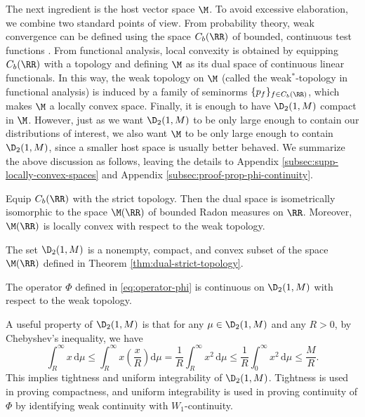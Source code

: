 The next ingredient is the host vector space $\M$. To avoid excessive elaboration, we combine two standard points of view. From probability theory, weak convergence can be defined using the space $C_b(\RR)$ of bounded, continuous test functions \cite[Chap. 1]{billingsley1999convergence}. From functional analysis, local convexity is obtained by equipping $C_b(\RR)$ with a topology and defining $\M$ as its dual space of continuous linear functionals. In this way, the weak topology on $\M$ (called the weak$^*$-topology in functional analysis) is induced by a family of seminorms $\{p_f\}_{f\in C_b(\RR)}$, which makes $\M$ a locally convex space. Finally, it is enough to have $\D_2(1, M)$ compact in $\M$. However, just as we want $\D_2(1, M)$ to be only large enough to contain our distributions of interest, we also want $\M$ to be only large enough to contain $\D_2(1, M)$, since a smaller host space is usually better behaved. We summarize the above discussion as follows, leaving the details to Appendix \ref{subsec:supp-locally-convex-spaces} and Appendix \ref{subsec:proof-prop-phi-continuity}.

\begin{theorem}
  \label{thm:dual-strict-topology}
  Equip $C_b(\RR)$ with the strict topology. Then the dual space is isometrically isomorphic to the space $\M(\RR)$ of bounded Radon measures on $\RR$. Moreover, $\M(\RR)$ is locally convex with respect to the weak topology.
\end{theorem}

\begin{proposition}
  \label{prop:nonempty-compact-convex}
  The set $\D_2(1, M)$ is a nonempty, compact, and convex subset of the space $\M(\RR)$ defined in Theorem \ref{thm:dual-strict-topology}.
\end{proposition}

\begin{proposition}
  \label{prop:phi-continuity}
  The operator $\Phi$ defined in \eqref{eq:operator-phi} is continuous on $\D_2(1, M)$ with respect to the weak topology.
\end{proposition}

A useful property of $\D_2(1, M)$ is that for any $\mu \in \D_2(1, M)$ and any $R > 0$, by Chebyshev's inequality, we have
$$\int_{R}^\infty x \,\mathrm{d}\mu \le \int_{R}^\infty x \left(\frac{x}{R} \right) \mathrm{d}\mu = \frac{1}{R} \int_{R}^\infty x^2 \,\mathrm{d}\mu \le \frac{1}{R} \int_{0}^\infty x^2 \,\mathrm{d}\mu \le \frac{M}{R}.$$
This implies tightness and uniform integrability of $\D_2(1, M)$. Tightness is used in proving compactness, and uniform integrability is used in proving continuity of $\Phi$ by identifying weak continuity with $W_1$-continuity.


